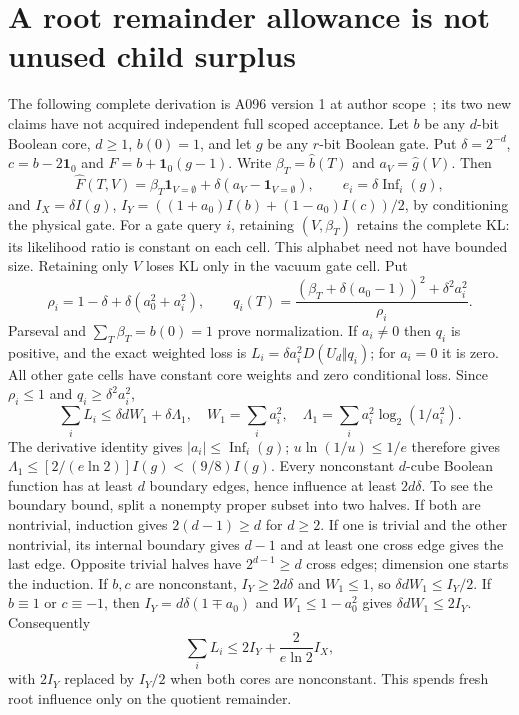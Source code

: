 \documentclass[11pt]{article}
\begin{document}
\section{A root remainder allowance is not unused child surplus}
\label{sec:childbank}
The following complete derivation is A096 version 1 at author scope~\cite{A096e};
its two new claims have not acquired independent full scoped acceptance.
Let $b$ be any $d$-bit Boolean core, $d\ge1$, $b(0)=1$, and let $g$ be
any $r$-bit Boolean gate. Put $\delta=2^{-d}$, $c=b-2\mathbf1_0$ and
$F=b+\mathbf1_0(g-1)$. Write $\beta_T=\widehat b(T)$ and
$a_V=\widehat g(V)$. Then
\[
 \widehat F(T,V)=\beta_T\mathbf1_{V=\emptyset}
       +\delta(a_V-\mathbf1_{V=\emptyset}),\qquad
 e_i=\delta\operatorname{Inf}_i(g),
\]
and $I_X=\delta I(g)$,
$I_Y=((1+a_0)I(b)+(1-a_0)I(c))/2$, by conditioning the physical gate.
For a gate query $i$, retaining $(V,\beta_T)$ retains the complete KL:
its likelihood ratio is constant on each cell. This alphabet need not
have bounded size. Retaining only $V$ loses KL only in the vacuum gate
cell. Put
\[
 \rho_i=1-\delta+\delta(a_0^2+a_i^2),\qquad
 q_i(T)=\frac{(\beta_T+\delta(a_0-1))^2+\delta^2a_i^2}{\rho_i}.
\]
Parseval and $\sum_T\beta_T=b(0)=1$ prove normalization. If $a_i\ne0$
then $q_i$ is positive, and the exact weighted loss is
$L_i=\delta a_i^2D(U_d\Vert q_i)$; for $a_i=0$ it is zero.
All other gate cells have constant core weights and zero conditional
loss. Since $\rho_i\le1$ and $q_i\ge\delta^2a_i^2$,
\[
 \sum_iL_i\le\delta d W_1+\delta\Lambda_1,\quad
 W_1=\sum_i a_i^2,\quad
 \Lambda_1=\sum_i a_i^2\log_2(1/a_i^2).
\]
The derivative identity gives $|a_i|\le\operatorname{Inf}_i(g)$;
$u\ln(1/u)\le1/e$ therefore gives
$\Lambda_1\le[2/(e\ln2)]I(g)<(9/8)I(g)$.
Every nonconstant $d$-cube Boolean function has at least $d$ boundary
edges, hence influence at least $2d\delta$. To see the boundary bound,
split a nonempty proper subset into two halves. If both are nontrivial,
induction gives $2(d-1)\ge d$ for $d\ge2$. If one is trivial and the
other nontrivial, its internal boundary gives $d-1$ and at least one
cross edge gives the last edge. Opposite trivial halves have $2^{d-1}
\ge d$ cross edges; dimension one starts the induction.
If $b,c$ are nonconstant, $I_Y\ge2d\delta$ and $W_1\le1$, so
$\delta dW_1\le I_Y/2$. If $b\equiv1$ or $c\equiv-1$, then
$I_Y=d\delta(1\mp a_0)$ and $W_1\le1-a_0^2$ gives
$\delta dW_1\le2I_Y$. Consequently
\[
 \sum_iL_i\le2I_Y+\frac{2}{e\ln2}I_X,
\]
with $2I_Y$ replaced by $I_Y/2$ when both cores are nonconstant.
This spends fresh root influence only on the quotient remainder.
\end{document}
